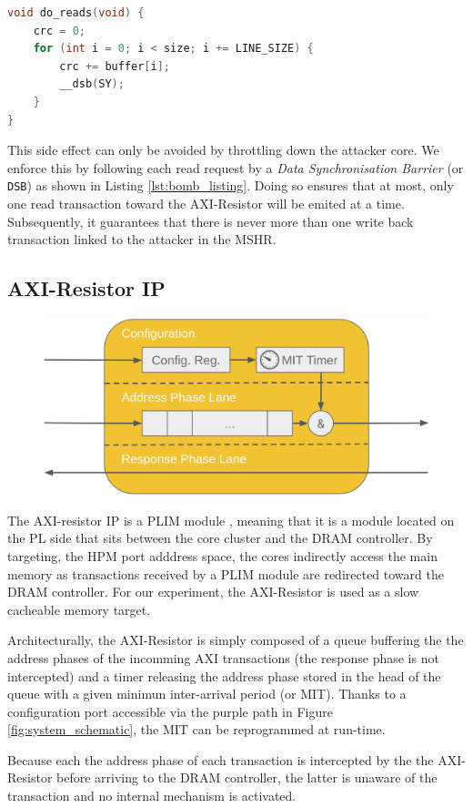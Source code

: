         \begin{lstlisting}[language=C, caption={Read memory-bomb code}, label={lst:bomb_listing}, basicstyle=\small, captionpos=b]
void do_reads(void) {
    crc = 0;
    for (int i = 0; i < size; i += LINE_SIZE) {
        crc += buffer[i];
        __dsb(SY);
    }
}
        \end{lstlisting}

        This side effect can only be avoided by throttling down the attacker core. We enforce this by following each read request by a \emph{Data Synchronisation Barrier} (or \texttt{DSB}) as shown in Listing \ref{lst:bomb_listing}. Doing so ensures that at most, only one read transaction toward the AXI-Resistor will be emited at a time. Subsequently, it guarantees that there is never more than one write back transaction linked to the attacker in the MSHR.

    \subsection{AXI-Resistor IP}
        \label{subsec:axi-resistor}
        \begin{figure}
            \centering
            \includegraphics[scale=0.11]{images/AXI-Resistor.png}
            \caption{}
            \label{fig:axi_resistor}
        \end{figure}

        The AXI-resistor IP is a PLIM module \cite{PLIM20}, meaning that it is a module located on the PL side that sits between the core cluster and the DRAM controller. By targeting, the HPM port adddress space, the cores indirectly access the main memory as transactions received by a PLIM module are redirected toward the DRAM controller.  For our experiment, the AXI-Resistor is used as a slow cacheable memory target.

        Architecturally, the AXI-Resistor is simply composed of a queue buffering the the address phases of the incomming AXI transactions \cite{ARM-AXI} (the response phase is not intercepted) and a timer releasing the address phase stored in the head of the queue with a given minimun inter-arrival period (or MIT). Thanks to a configuration port accessible via the purple path in Figure \ref{fig:system_schematic}, the MIT can be reprogrammed at run-time.

        Because each the address phase of each transaction is intercepted by the the AXI-Resistor before arriving to the DRAM controller, the latter is unaware of the transaction and no internal mechanism is activated.
